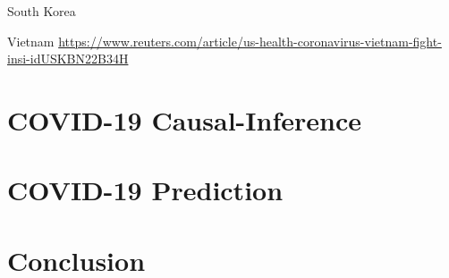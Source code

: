 \documentclass[
]{book}
\begin{document}
South Korea

Vietnam
\url{https://www.reuters.com/article/us-health-coronavirus-vietnam-fight-insi-idUSKBN22B34H}

\hypertarget{covid-19-causal-inference}{%
\chapter{COVID-19 Causal-Inference}\label{covid-19-causal-inference}}

\hypertarget{covid-19-prediction}{%
\chapter{COVID-19 Prediction}\label{covid-19-prediction}}

\hypertarget{conclusion}{%
\chapter{Conclusion}\label{conclusion}}

  
\end{document}
